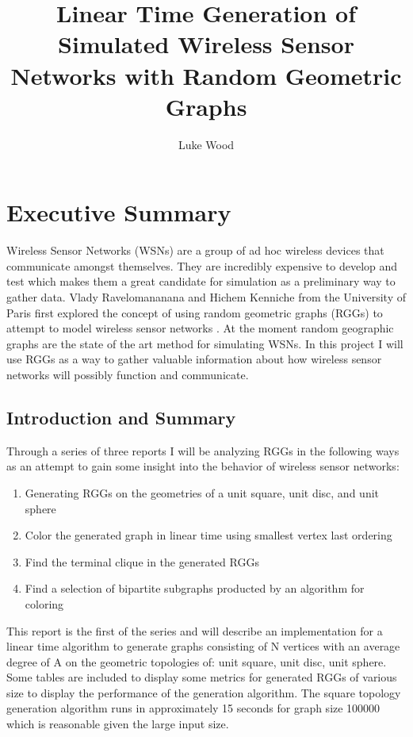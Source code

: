 \documentclass{article}
\begin{document}
  \title{Linear Time Generation of Simulated Wireless Sensor Networks with Random Geometric Graphs}
  \author{Luke Wood}
  \maketitle

  \section{Executive Summary}
	Wireless Sensor Networks (WSNs) are a group of ad hoc wireless devices that communicate amongst themselves.
	They are incredibly expensive to develop and test which makes them a great candidate for simulation as a preliminary way to gather data.
	Vlady Ravelomananana and Hichem Kenniche from the University of Paris first explored the concept of using random geometric graphs (RGGs) to attempt to model wireless sensor networks \cite{kenniche2010random}.
  At the moment random geographic graphs are the state of the art method for simulating WSNs.
	In this project I will use RGGs as a way to gather valuable information about how wireless sensor networks will possibly function and communicate.

  \subsection{Introduction and Summary}
	Through a series of three reports	I will be analyzing RGGs in the following ways as an attempt to gain some insight into the behavior of wireless sensor networks:
	\begin{enumerate}
		\item Generating RGGs on the geometries of a unit square, unit disc, and unit sphere
		\item Color the generated graph in linear time using smallest vertex last ordering
		\item Find the terminal clique in the generated RGGs
		\item Find a selection of bipartite subgraphs producted by an algorithm for coloring
	\end{enumerate}
	This report is the first of the series and will describe an implementation for a linear time algorithm to generate graphs consisting of N vertices with an average degree of A on the geometric topologies of: unit square, unit disc, unit sphere.
	Some tables are included to display some metrics for generated  RGGs of various size to display the performance of the generation algorithm.
	The square topology generation algorithm runs in approximately 15 seconds for graph size 100000 which is reasonable given the large input size.
\end{document}
